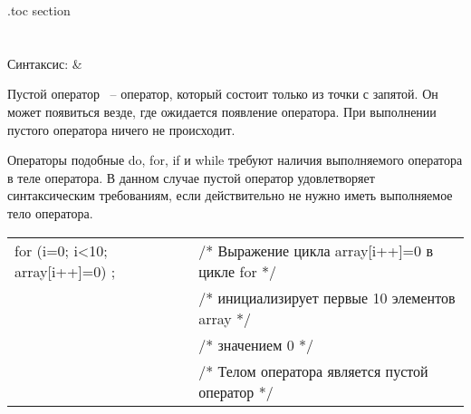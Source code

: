 \renewcommand{\lstlistingname}{Пример} 

\etocsettocdepth.toc {section}

\chapter{}
\label{sec:Operators}
\section{}

\begin{pHeader}
Синтаксис:      & \RightHandText{ ;}\\
\end{pHeader}

Пустой оператор ~-- оператор, который состоит только из точки с запятой. Он может появиться везде, где ожидается появление оператора. При выполнении пустого оператора ничего не происходит.\killoverfullbefore 

Операторы подобные do, for, if и while требуют наличия выполняемого оператора в теле оператора. В данном случае пустой оператор удовлетворяет синтаксическим требованиям, если действительно не нужно иметь выполняемое тело оператора. \killoverfullbefore \BL

\begin{pExample}
\begin{tabular}{ l l }
for (i=0; i<10; array[i++]=0){ } ;  & \textcolor{exComm}{/* Выражение цикла array[i++]=0 в цикле for */} \\
 & \textcolor{exComm}{/* инициализирует первые 10 элементов array */} \\
 & \textcolor{exComm}{/* значением 0 */} \\
 & \textcolor{exComm}{/* Телом оператора является пустой оператор */} \\
\end{tabular}
\end{pExample}

\section{}

